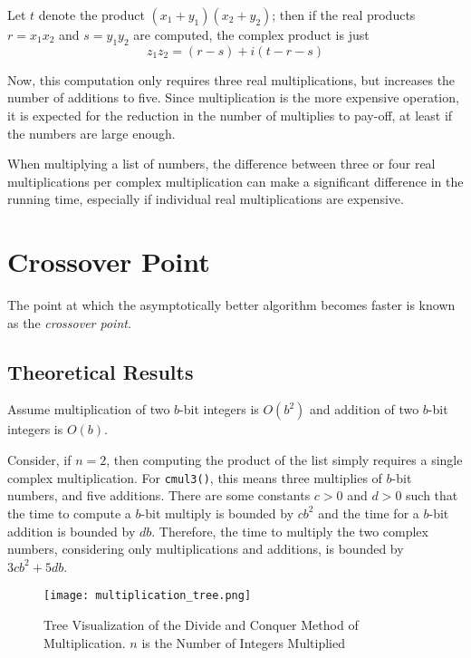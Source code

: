 \documentclass[usletter, 12pt]{article}
\begin{document}
        Let $t$ denote the product $(x_{1}+y_{1})(x_{2}+y_{2})$; then if the real products $r=x_{1}x_{2}$ and $s=y_{1}y_{2}$ are computed, the complex product is just
            \[ z_{1}z_{2}=(r-s)+i(t-r-s) \]

        Now, this computation only requires three real multiplications, but increases the number of additions to five. Since multiplication is the more expensive operation, it is expected for the reduction in the number of multiplies to pay-off, at least if the numbers are large enough.

        When multiplying a list of numbers, the difference between three or four real multiplications per complex multiplication can make a significant difference in the running time, especially if individual real multiplications are expensive.

    \section{Crossover Point}

        The point at which the asymptotically better algorithm becomes faster is known as the \textit{crossover point}.

        \subsection{Theoretical Results}
        Assume multiplication of two $b$-bit integers is $O(b^{2})$ and addition of two $b$-bit integers is $O(b)$.

        Consider, if $n = 2$, then computing the product of the list simply requires a single complex multiplication. For \texttt{cmul3()}, this means three multiplies of $b$-bit numbers, and five additions. There are some constants $c>0$ and $d>0$ such that the time to compute a $b$-bit multiply is bounded by $cb^2$ and the time for a $b$-bit addition is bounded by $db$.  Therefore, the time to multiply the two complex numbers, considering only multiplications and additions, is bounded by $3cb^2+5db$.

        \begin{figure}[ht]
            \begin{center}
                \texttt{[image: multiplication\_tree.png]}
                \caption{Tree Visualization of the Divide and Conquer Method of Multiplication. $n$ is the Number of Integers Multiplied} \label{multiplication_tree}
            \end{center}
        \end{figure}
\end{document}
